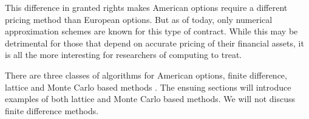 This difference in granted rights makes American options require a different
pricing method than European options. But as of today, only numerical
approximation schemes are known for this type of contract. While this may be
detrimental for those that depend on accurate pricing of their financial
assets, it is all the more interesting for researchers of computing to treat.

There are three classes of algorithms for American options, finite
difference, lattice and Monte Carlo based methods
\cite{ibanez2004monte}. The ensuing sections will introduce examples
of both lattice and Monte Carlo based methods. We will not discuss
finite difference methods.

